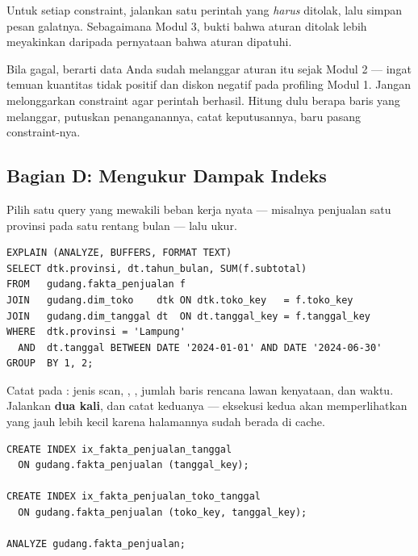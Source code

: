Untuk setiap constraint, jalankan satu perintah yang \emph{harus} ditolak, lalu
simpan pesan galatnya. Sebagaimana Modul 3, bukti bahwa aturan ditolak lebih
meyakinkan daripada pernyataan bahwa aturan dipatuhi.

\begin{peringatan}
Bila  gagal, berarti data Anda sudah melanggar aturan
itu sejak Modul 2 --- ingat temuan kuantitas tidak positif dan diskon negatif
pada profiling Modul 1. Jangan melonggarkan constraint agar perintah berhasil.
Hitung dulu berapa baris yang melanggar, putuskan penanganannya, catat
keputusannya, baru pasang constraint-nya.
\end{peringatan}

\subsection{Bagian D: Mengukur Dampak Indeks}


Pilih satu query yang mewakili beban kerja nyata --- misalnya penjualan satu
provinsi pada satu rentang bulan --- lalu ukur.

\begin{lstlisting}[style=sqlgaya]
EXPLAIN (ANALYZE, BUFFERS, FORMAT TEXT)
SELECT dtk.provinsi, dt.tahun_bulan, SUM(f.subtotal)
FROM   gudang.fakta_penjualan f
JOIN   gudang.dim_toko    dtk ON dtk.toko_key   = f.toko_key
JOIN   gudang.dim_tanggal dt  ON dt.tanggal_key = f.tanggal_key
WHERE  dtk.provinsi = 'Lampung'
  AND  dt.tanggal BETWEEN DATE '2024-01-01' AND DATE '2024-06-30'
GROUP  BY 1, 2;
\end{lstlisting}

Catat pada : jenis scan, ,
, jumlah baris rencana lawan kenyataan, dan waktu.
Jalankan \textbf{dua kali}, dan catat keduanya --- eksekusi kedua akan
memperlihatkan  yang jauh lebih kecil karena halamannya
sudah berada di cache.


\begin{lstlisting}[style=sqlgaya]
CREATE INDEX ix_fakta_penjualan_tanggal
  ON gudang.fakta_penjualan (tanggal_key);

CREATE INDEX ix_fakta_penjualan_toko_tanggal
  ON gudang.fakta_penjualan (toko_key, tanggal_key);

ANALYZE gudang.fakta_penjualan;
\end{lstlisting}

